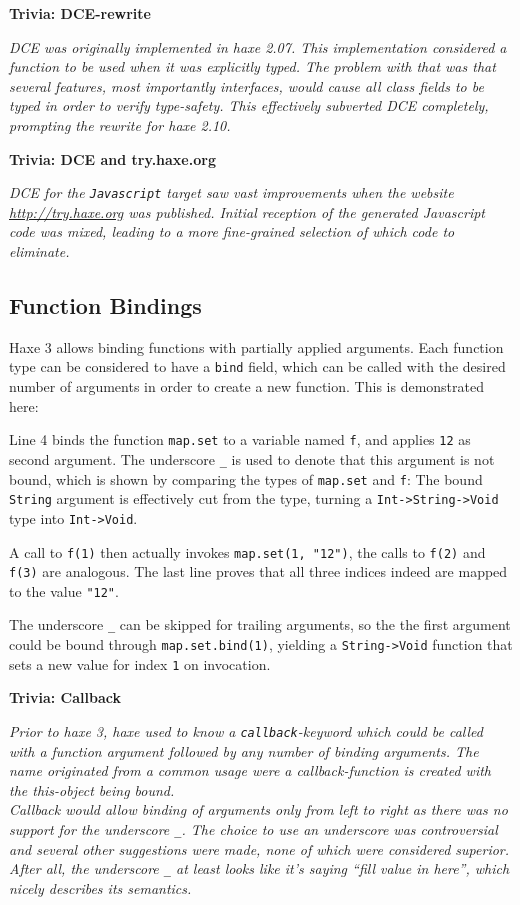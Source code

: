 \documentclass{article}
\newcommand{\target}[1]{#1}
\newcommand{\type}[1]{\texttt{#1}}
\newcommand{\expr}[1]{\texttt{#1}}
\newenvironment{myshaded}
  {\def\FrameCommand{\fboxsep=\topsep\colorbox{bgcolor}}%
  \MakeFramed {\advance\hsize-\width \FrameRestore}}%
 {\endMakeFramed}
\newcommand{\trivia}[2]
	{\begin{myshaded}\noindent\textbf{Trivia: #1}\par\nobreak\noindent\ignorespaces\textit{#2}\end{myshaded}}
\begin{document}
\trivia{DCE-rewrite}{DCE was originally implemented in haxe 2.07. This implementation considered a function to be used when it was explicitly typed. The problem with that was that several features, most importantly interfaces, would cause all class fields to be typed in order to verify type-safety. This effectively subverted DCE completely, prompting the rewrite for haxe 2.10.}

\trivia{DCE and try.haxe.org}{DCE for the \type{Javascript} target saw vast improvements when the website \url{http://try.haxe.org} was published. Initial reception of the generated \target{Javascript} code was mixed, leading to a more fine-grained selection of which code to eliminate.}


\subsection{Function Bindings}
\label{Function Bindings}

Haxe 3 allows binding functions with partially applied arguments. Each function type can be considered to have a \expr{bind} field, which can be called with the desired number of arguments in order to create a new function. This is demonstrated here:


Line 4 binds the function \expr{map.set} to a variable named \expr{f}, and applies \expr{12} as second argument. The underscore \expr{_} is used to denote that this argument is not bound, which is shown by comparing the types of \expr{map.set} and \expr{f}: The bound \type{String} argument is effectively cut from the type, turning a \expr{Int->String->Void} type into \expr{Int->Void}.

A call to \expr{f(1)} then actually invokes \expr{map.set(1, "12")}, the calls to \expr{f(2)} and \expr{f(3)} are analogous. The last line proves that all three indices indeed are mapped to the value \expr{"12"}.

The underscore \expr{_} can be skipped for trailing arguments, so the the first argument could be bound through \expr{map.set.bind(1)}, yielding a \expr{String->Void} function that sets a new value for index \expr{1} on invocation.

\trivia{Callback}{Prior to haxe 3, haxe used to know a \expr{callback}-keyword which could be called with a function argument followed by any number of binding arguments. The name originated from a common usage were a callback-function is created with the this-object being bound.\\
Callback would allow binding of arguments only from left to right as there was no support for the underscore \expr{_}. The choice to use an underscore was controversial and several other suggestions were made, none of which were considered superior. After all, the underscore \expr{_} at least looks like it's saying ``fill value in here'', which nicely describes its semantics.}
\end{document}
